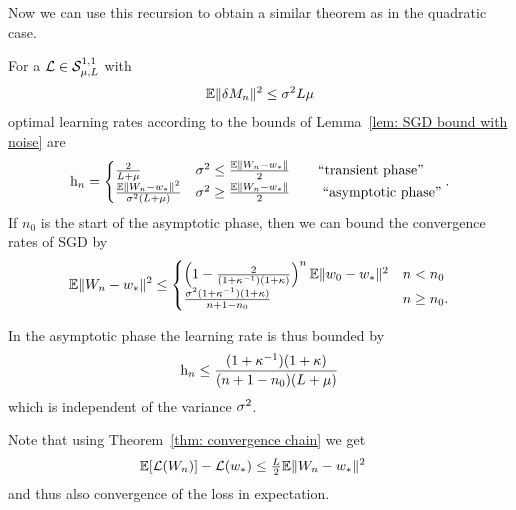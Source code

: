 Now we can use this recursion to obtain a similar theorem as in the quadratic
case.

\begin{theorem}\label{thm: optimal rates SGD}
	For a \(\mathcal{L}\in\mathcal{S}^{1,1}_{{\mu},{L}}\) with
	\begin{align*}
		\mathbb{E}\|\delta M_n\|^2 \le \sigma^2L\mu
	\end{align*}
	optimal learning rates according to the bounds of Lemma~\ref{lem: SGD bound with noise} are
	\begin{align*}
		\text{h}_n
		= \begin{cases}
			\frac{2}{L+\mu}
			& \sigma^2 \le \frac{\mathbb{E}\|W_n - w_*\|}{2}
			\qquad \text{``transient phase''}\\
			\frac{\mathbb{E}\|W_n -w_*\|^2}{\sigma^2(L+\mu)}
			& \sigma^2 \ge \frac{\mathbb{E}\|W_n - w_*\|}{2}
			\qquad \text{ ``asymptotic phase''}
		\end{cases}.
	\end{align*}
	If \(n_0\) is the start of the asymptotic phase, then we can bound the
	convergence rates of SGD by
	\begin{align*}
		\mathbb{E}\|W_n - w_*\|^2
		\le \begin{cases}
			\left(1-\frac{2}{(1+\kappa^{-1})(1+\kappa)}\right)^n\mathbb{E}\|w_0 -w_*\|^2
			& n < n_0\\
			\frac{\sigma^2(1+\kappa^{-1})(1+\kappa)}{n+1-n_0} & n \ge n_0.
		\end{cases}
	\end{align*}
\end{theorem}
\begin{remark}
	In the asymptotic phase the learning rate is thus bounded by
	\begin{align*}
		\text{h}_n \le \frac{(1+\kappa^{-1})(1+\kappa)}{(n+1-n_0)(L + \mu)}
	\end{align*}
	which is independent of the variance \(\sigma^2\).
\end{remark}
\begin{remark}\label{rem: expected loss is a special case of L2 weight convergence}
	Note that using Theorem~\ref{thm: convergence chain} we get
	\begin{align*}
		\mathbb{E}[\mathcal{L}(W_n)]- \mathcal{L}(w_*)
		&\le \tfrac{L}{2}\mathbb{E}\|W_n-w_*\|^2
	\end{align*}
	and thus also convergence of the loss in expectation.
\end{remark}

